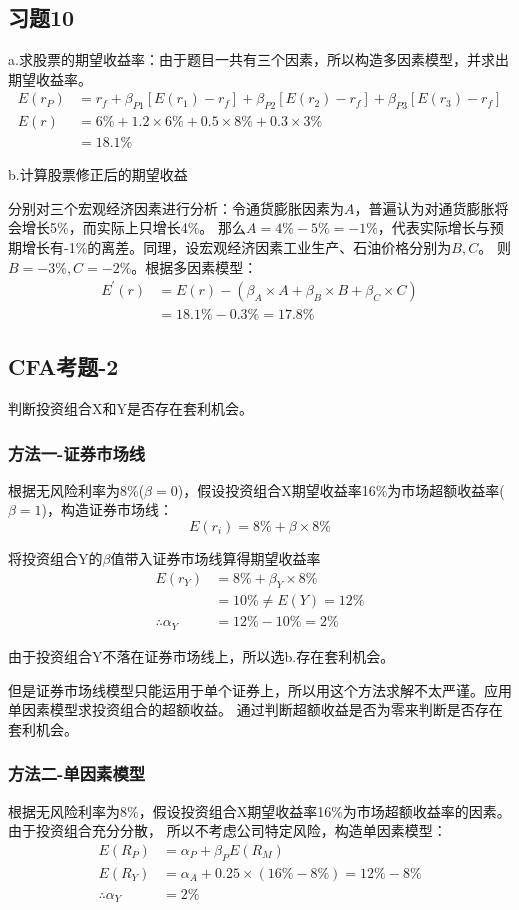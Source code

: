 \documentclass{article}
\begin{document}
\clearpage
\subsection*{习题10}
 a.求股票的期望收益率：由于题目一共有三个因素，所以构造多因素模型，并求出期望收益率。
 \begin{align}
    E(r_P)&=r_f+\beta_{P1}[E(r_1)-r_f]+\beta_{P2}[E(r_2)-r_f]+\beta_{P3}[E(r_3)-r_f]\\
    E(r)&=6\%+1.2\times 6\%+0.5\times 8\% + 0.3\times 3\%\\
    &=18.1\%
 \end{align}

b.计算股票修正后的期望收益

分别对三个宏观经济因素进行分析：令通货膨胀因素为$A$，普遍认为对通货膨胀将会增长5\%，而实际上只增长4\%。
那么$A=4\%-5\%=-1\%$，代表实际增长与预期增长有-1\%的离差。同理，设宏观经济因素工业生产、石油价格分别为$B,C$。
则$B=-3\%,C=-2\%$。根据多因素模型：
\begin{align}
    E^{\prime}(r)&=E(r)-(\beta_A \times A +\beta_B \times B +\beta_C \times C )\\
    &=18.1\%-0.3\%=17.8\%
\end{align}

\subsection*{CFA考题-2}
判断投资组合X和Y是否存在套利机会。
\subsubsection*{方法一-证券市场线}
根据无风险利率为8\%($\beta = 0$)，假设投资组合X期望收益率16\%为市场超额收益率($\beta =1$)，构造证券市场线：
\[E(r_i)=8\%+\beta \times 8\%\]

将投资组合Y的$\beta$值带入证券市场线算得期望收益率
\begin{align}
    E(r_Y)&=8\% + \beta_Y \times 8\%\\
    &=10\%\neq E(Y)=12\%\\
    \therefore \alpha_Y&=12\%-10\%=2\%
\end{align}

由于投资组合Y不落在证券市场线上，所以选b.存在套利机会。

但是证券市场线模型只能运用于单个证券上，所以用这个方法求解不太严谨。应用单因素模型求投资组合的超额收益。
通过判断超额收益是否为零来判断是否存在套利机会。
\subsubsection*{方法二-单因素模型}
根据无风险利率为8\%，假设投资组合X期望收益率16\%为市场超额收益率的因素。由于投资组合充分分散，
所以不考虑公司特定风险，构造单因素模型：
\begin{align}
    E(R_P)&=\alpha_P+\beta_PE(R_M)\\
    E(R_Y)&=\alpha_A+0.25\times (16\%-8\%)=12\%-8\%\\
  \therefore  \alpha_Y&=2\%
\end{align}
\end{document}
